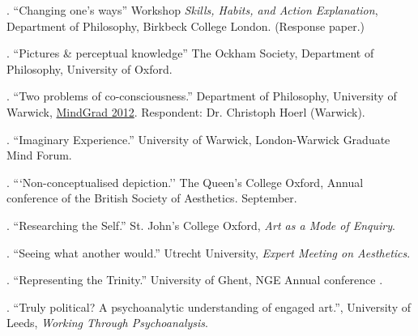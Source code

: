 \documentclass[11pt]{article}
\begin{document}
% 
% 
% 
% 
% 

\bigskip

\newpage
\medskip
{}. ``Changing one's ways'' Workshop \emph{Skills, Habits, and Action Explanation}, Department of Philosophy, Birkbeck College London. (Response paper.)

. ``Pictures \& perceptual knowledge'' The Ockham Society, Department of Philosophy, University of Oxford.

. ``Two problems of co-consciousness.'' Department of Philosophy, University of Warwick, \href{http://www2.warwick.ac.uk/fac/soc/philosophy/news/conferences/mindgrad-2012/}{MindGrad 2012}. Respondent: Dr. Christoph Hoerl (Warwick).

. ``Imaginary Experience.'' University of Warwick, London-Warwick Graduate Mind Forum.


. ```Non-conceptualised depiction.'' The Queen's College Oxford, Annual conference of the British Society of Aesthetics. September.

. ``Researching the Self.'' St. John's College Oxford, \emph{Art as a Mode of Enquiry}.

. ``Seeing what another would.'' Utrecht University, \emph{Expert Meeting on Aesthetics}.

. ``Representing the Trinity.'' University of Ghent, NGE Annual conference .

. ``Truly political? A psychoanalytic understanding of engaged art.'', University of Leeds, \emph{Working Through Psychoanalysis}.

% 
\end{document}
